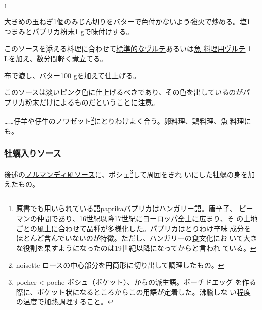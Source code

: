 \begin{recette}
\footnote{原書でも用いられている語paprikaパプリカはハンガリー語。唐辛子、
  ピーマンの仲間であり、16世紀以降17世紀にヨーロッパ全土に広まり、そ
  の土地ごとの風土に合わせて品種が多様化した。パプリカはとりわけ辛味
  成分をほとんど含んでいないのが特徴。ただし、ハンガリーの食文化にお
  いて大きな役割を果すようになったのは19世紀以降になってからと言われ
  ている。}


大きめの玉ねぎ1個のみじん切りをバターで色付かないよう強火で炒める。塩1
つまみとパプリカ粉末1 gで味付けする。

このソースを添える料理に合わせて\protect\hyperlink{veloute}{標準的なヴルテ}あるいは\protect\hyperlink{veloute-de-poisson}{魚
料理用ヴルテ} 1 Lを加え、数分間軽く煮立てる。

布で漉し、バター100 gを加えて仕上げる。

このソースは淡いピンク色に仕上げるべきであり、その色を出しているのがパ
プリカ粉末だけによるものだということに注意。

\ldots{}\ldots{}仔羊や仔牛のノワゼット\footnote{noisette
  ロースの中心部分を円筒形に切り出して調理したもの。}にとりわけよく合う。卵料理、鶏料理、魚
料理にも。

\maeaki

\hypertarget{sauce-aux-huitres}{%
\subsubsection{牡蠣入りソース}\label{sauce-aux-huitres}}



後述の\protect\hyperlink{sauce-normande}{ノルマンディ風ソース}に、ポシェ\footnote{pocher
  \textless{} poche ポシュ（ポケット）、からの派生語。ポーチドエッグ
  を作る際に、ポケット状になるところからこの用語が定着した。沸騰しな
  い程度の温度で加熱調理すること。}して周囲をきれ
いにした牡蠣の身を加えたもの。


\end{recette}
